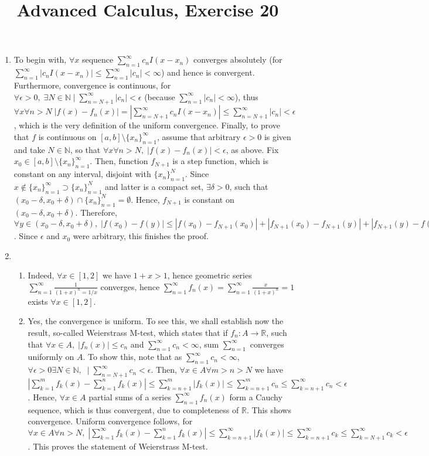 \documentclass[8pt]{article} %
\title{Advanced Calculus, Exercise 20}
\newcommand{\myabs}[1]{\left|#1\right|}
\let\oldsum\sum
\renewcommand*{\sum}{\displaystyle\oldsum}
\begin{document}
\maketitle
\begin{enumerate}
\item{To begin with, $\forall x$ sequence $\sum_{n=1}^\infty c_nI(x-x_n)$ converges absolutely (for $\sum_{n=1}^\infty\myabs{c_nI(x-x_n)}\leq \sum_{n=1}^\infty\myabs{c_n}
	<\infty$) and hence is convergent. Furthermore, convergence is continuous, for $\forall \epsilon>0,\;\exists N\in\mathbb{N}\mid \sum_{n=N+1}^\infty \myabs{c_n}<\epsilon$
	(because $\sum_{n=1}^\infty\myabs{c_n}<\infty$), thus $\forall x\forall n>N\;\myabs{f(x)-f_n(x)}=\myabs{\sum_{n=N+1}^\infty c_nI(x-x_n)}\leq\sum_{n=N+1}^\infty\myabs{c_n}<
	\epsilon$, which is the very definition of the uniform convergence. Finally, to prove that $f$ is continuous on $[a,b]\setminus \{x_n\}_{n=1}^\infty$, assume that 
	arbitrary $\epsilon>0$ is given and take $N\in\mathbb{N}$, so that $\forall x\forall n>N,\;\myabs{f(x)-f_n(x)}<\epsilon$, as above. Fix 
	$x_0\in[a,b]\setminus \{x_n\}_{n=1}^\infty$. Then, function $f_{N+1}$ is a
	step function, which is constant on any interval, disjoint with $\{x_n\}_{n=1}^N$. Since $x\notin\{x_n\}_{n=1}^\infty\supset\{x_n\}_{n=1}^N$ and latter is a compact
	set, $\exists \delta>0$, such that $(x_0-\delta,x_0+\delta)\cap\{x_n\}_{n=1}^N=\emptyset$. Hence, $f_{N+1}$ is constant on $(x_0-\delta,x_0+\delta)$. Therefore,
	$\forall y\in(x_0-\delta,x_0+\delta),\; \myabs{f(x_0)-f(y)}\leq \myabs{f(x_0)-f_{N+1}(x_0)}+\myabs{f_{N+1}(x_0)-f_{N+1}(y)}+\myabs{f_{N+1}(y)-f(y)}\leq
	\epsilon+0+\epsilon=2\epsilon$. Since $\epsilon$ and $x_0$ were arbitrary, this finishes the proof.
}
\item{\begin{enumerate}[label=(\alph*)]
		\item{Indeed, $\forall x\in[1,2]$ we have $1+x>1$, hence geometric series $\sum_{n=1}^\infty\frac{1}{(1+x)^n=1/x}$ converges,
			hence $\sum_{n=1}^\infty f_n(x)=\sum_{n=1}^\infty\frac{x}{(1+x)^n}=1$ exists $\forall x\in[1,2]$.}
		\item{Yes, the convergence is uniform. To see this, we shall establish now the result, so-called Weierstrass M-test, which states that if $f_n:A\to\mathbb{R}$, such that
			$\forall x\in A,\;\myabs{f_n(x)}\leq c_n$ and $\sum_{n=1}^\infty c_n<\infty$, sum $\sum_{n=1}^\infty$ converges uniformly on $A$. 
			To show this, note that 
			as $\sum_{n=1}^\infty c_n<\infty$, $\forall \epsilon>0\exists N\in\mathbb{N},\;\mid \sum_{n=N+1}^\infty c_n<\epsilon$. Then, $\forall x\in A\forall m>n>N$ we have
			$\myabs{\sum_{k=1}^m f_k(x)-\sum_{k=1}^n f_k(x)}\leq \sum_{k=n+1}^m\myabs{f_k(x)}\leq \sum_{k=n+1}^m c_n\leq\sum_{k=n+1}^\infty c_n<\epsilon$. Hence, 
			$\forall x\in A$ partial sums of a series $\sum_{n=1}^\infty f_n(x)$ form a Cauchy sequence, which is thus convergent, due to completeness of $\mathbb{R}$. This
			shows convergence. Uniform convergence follows, for $\forall x\in A\forall n>N,\; \myabs{\sum_{k=1}^\infty f_k(x)-\sum_{k=1}^n f_k(x)}\leq
			\sum_{k=n+1}^\infty \myabs{f_k(x)}\leq \sum_{k=n+1}^\infty c_k\leq \sum_{k=N+1}^\infty c_k<\epsilon$. This proves the statement of Weierstrass M-test.

}
\end{enumerate}}
\end{enumerate}
\end{document}
